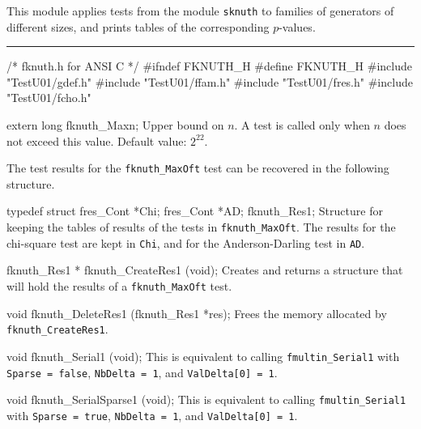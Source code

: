 
This module applies tests from the module {\tt sknuth}
to families of generators of different sizes,
and prints tables of the corresponding $p$-values.


\bigskip
\hrule
\code\hide
/* fknuth.h for ANSI C */
#ifndef FKNUTH_H
#define FKNUTH_H
\endhide
#include "TestU01/gdef.h"
#include "TestU01/ffam.h"
#include "TestU01/fres.h"
#include "TestU01/fcho.h"


extern long fknuth_Maxn;
\endcode
\tab
  Upper bound on $n$.
  A test is called only when $n$ does not exceed this value.
  Default value: $2^{22}$.
\endtab
\ifdetailed  %



The test results for the {\tt fknuth\_MaxOft} test can be recovered
in the following structure.

\code

typedef struct {
   fres_Cont *Chi;
   fres_Cont *AD;
} fknuth_Res1;
\endcode
 \tab
  Structure for keeping the tables of results of the tests in
  {\tt fknuth\_MaxOft}. The results for the chi-square test are kept in
  {\tt Chi}, and for the Anderson-Darling test in  {\tt AD}.
 \endtab
\code


fknuth_Res1 * fknuth_CreateRes1 (void);
\endcode
 \tab
  Creates and returns a structure that will hold the results
  of a  {\tt fknuth\_MaxOft} test.
 \endtab
\code


void fknuth_DeleteRes1 (fknuth_Res1 *res);
\endcode
 \tab
  Frees the memory allocated by {\tt fknuth\_CreateRes1}.
 \endtab

\fi    %


\code

void fknuth_Serial1 (void);
\endcode
\tab This is equivalent to calling
 {\tt fmultin\_Serial1} with {\tt Sparse = false},
  {\tt NbDelta = 1}, and {\tt Val\-Delta[0] = 1}.
 \endtab
\code


void fknuth_SerialSparse1 (void);
\endcode
\tab This is equivalent to calling {\tt fmultin\_Serial1} with
  {\tt Sparse = true},  {\tt NbDelta = 1}, and {\tt Val\-Delta[0] = 1}.
 \endtab
\code


